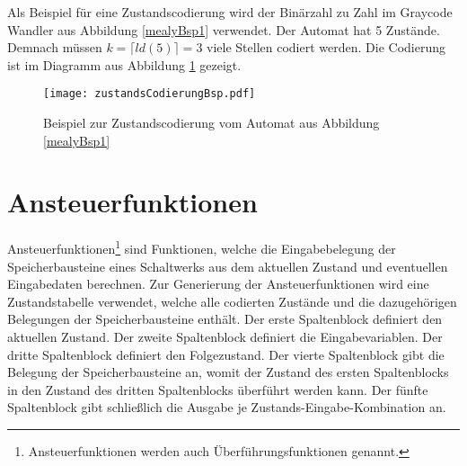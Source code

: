 Als Beispiel für eine Zustandscodierung wird der Binärzahl zu Zahl im Graycode Wandler aus Abbildung \ref{mealyBsp1} verwendet. Der Automat hat 5 Zustände. Demnach müssen $k = \lceil ld(5) \rceil = 3$ viele Stellen codiert werden. Die Codierung ist im Diagramm aus Abbildung \ref{zusCod} gezeigt.

\begin{figure}[htp]
	\centering
	\texttt{[image: zustandsCodierungBsp.pdf]}
	\caption{Beispiel zur Zustandscodierung vom Automat aus Abbildung \ref{mealyBsp1}}
	\label{zusCod}
\end{figure}

\section{Ansteuerfunktionen}
Ansteuerfunktionen\footnote{Ansteuerfunktionen werden auch Überführungsfunktionen genannt.} sind Funktionen, welche die Eingabebelegung der Speicherbausteine eines Schaltwerks aus dem aktuellen Zustand und eventuellen Eingabedaten berechnen. Zur Generierung der Ansteuerfunktionen wird eine Zustandstabelle verwendet, welche alle codierten Zustände und die dazugehörigen Belegungen der Speicherbausteine enthält. Der erste Spaltenblock definiert den aktuellen Zustand. Der zweite Spaltenblock definiert die Eingabevariablen. Der dritte Spaltenblock definiert den Folgezustand. Der vierte Spaltenblock gibt die Belegung der Speicherbausteine an, womit der Zustand des ersten Spaltenblocks in den Zustand des dritten Spaltenblocks überführt werden kann. Der fünfte Spaltenblock gibt schließlich die Ausgabe je Zustands-Eingabe-Kombination an.

